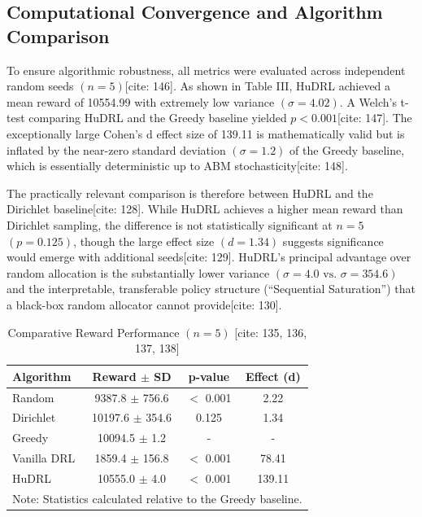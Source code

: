 \documentclass[conference]{IEEEtran}
\begin{document}
\subsection{Computational Convergence and Algorithm Comparison}
To ensure algorithmic robustness, all metrics were evaluated across independent random seeds $(n=5)$[cite: 146]. As shown in Table III, HuDRL achieved a mean reward of 10554.99 with extremely low variance $(\sigma=4.02)$. A Welch's t-test comparing HuDRL and the Greedy baseline yielded $p<0.001$[cite: 147]. The exceptionally large Cohen's d effect size of 139.11 is mathematically valid but is inflated by the near-zero standard deviation $(\sigma=1.2)$ of the Greedy baseline, which is essentially deterministic up to ABM stochasticity[cite: 148]. 

The practically relevant comparison is therefore between HuDRL and the Dirichlet baseline[cite: 128]. While HuDRL achieves a higher mean reward than Dirichlet sampling, the difference is not statistically significant at $n=5$ $(p=0.125)$, though the large effect size $(d=1.34)$ suggests significance would emerge with additional seeds[cite: 129]. HuDRL's principal advantage over random allocation is the substantially lower variance $(\sigma=4.0 \text{ vs. } \sigma=354.6)$ and the interpretable, transferable policy structure (``Sequential Saturation'') that a black-box random allocator cannot provide[cite: 130]. 

\begin{table}[htbp]
\caption{Comparative Reward Performance $(n=5)$ [cite: 135, 136, 137, 138]}
\begin{center}
\begin{tabular}{|l|c|c|c|}
\hline
\textbf{Algorithm} & \textbf{Reward $\pm$ SD} & \textbf{p-value} & \textbf{Effect (d)} \\
\hline
Random & 9387.8 $\pm$ 756.6 & $<$ 0.001 & 2.22 \\
Dirichlet & 10197.6 $\pm$ 354.6 & 0.125 & 1.34 \\
Greedy & 10094.5 $\pm$ 1.2 & - & - \\
Vanilla DRL & 1859.4 $\pm$ 156.8 & $<$ 0.001 & 78.41 \\
HuDRL & 10555.0 $\pm$ 4.0 & $<$ 0.001 & 139.11 \\
\hline
\multicolumn{4}{l}{\small Note: Statistics calculated relative to the Greedy baseline.}
\end{tabular}
\end{center}
\end{table}
\end{document}
